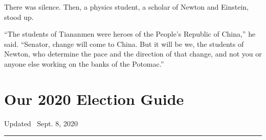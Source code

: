 There was silence. Then, a physics student, a scholar of Newton and
Einstein, stood up.

``The students of Tiananmen were heroes of the People's Republic of
China,'' he said. ``Senator, change will come to China. But it will be
we, the students of Newton, who determine the pace and the direction of
that change, and not you or anyone else working on the banks of the
Potomac.''

\hypertarget{our-2020-election-guide}{%
\section{Our 2020 Election Guide}\label{our-2020-election-guide}}

Updated ~Sept. 8, 2020

\begin{center}\rule{0.5\linewidth}{\linethickness}\end{center}

